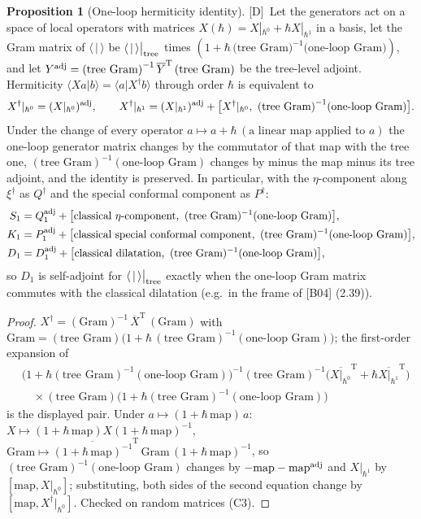 \documentclass[11pt]{article}
\theoremstyle{definition}
\newtheorem{proposition}{Proposition}
\newcommand{\Dl}{\textup{[D]}}
\newcommand{\tree}{\big|_{\rm tree}}
\begin{document}
\begin{proposition}[One-loop hermiticity identity]\label{t:herm}
\Dl\ Let the generators act on a space of local operators with matrices $X(\hbar)=X|_{\hbar^0}+\hbar X|_{\hbar^1}$ in a basis, let the Gram matrix of $\langle\,|\,\rangle$ be $\langle\,|\,\rangle\tree$ times $(1+\hbar\,\text{(tree Gram)}^{-1}\text{(one-loop Gram)})$, and let $Y^{\rm adj}=\text{(tree Gram)}^{-1}\,\overline Y^{\mathrm T}\,\text{(tree Gram)}$ be the tree-level adjoint. Hermiticity $\langle Xa|b\rangle=\langle a|X^\dagger b\rangle$ through order $\hbar$ is equivalent to
\[
X^\dagger|_{\hbar^0}=(X|_{\hbar^0})^{\rm adj},\qquad X^\dagger|_{\hbar^1}=(X|_{\hbar^1})^{\rm adj}+\big[X^\dagger|_{\hbar^0},\ \text{(tree Gram)}^{-1}\text{(one-loop Gram)}\big].
\]
Under the change of every operator $a\mapsto a+\hbar\,(\text{a linear map applied to }a)$ the one-loop generator matrix changes by the commutator of that map with the tree one, $(\text{tree Gram})^{-1}(\text{one-loop Gram})$ changes by minus the map minus its tree adjoint, and the identity is preserved. In particular, with the $\eta$-component along $\xi^\dagger$ as $Q^\dagger$ and the special conformal component as $P^\dagger$:
\[
\begin{aligned}
S_1&=Q_1^{\rm adj}+\big[\text{classical }\eta\text{-component},\ (\text{tree Gram})^{-1}(\text{one-loop Gram})\big],\\
K_1&=P_1^{\rm adj}+\big[\text{classical special conformal component},\ (\text{tree Gram})^{-1}(\text{one-loop Gram})\big],\\
D_1&=D_1^{\rm adj}+\big[\text{classical dilatation},\ (\text{tree Gram})^{-1}(\text{one-loop Gram})\big],
\end{aligned}
\]
so $D_1$ is self-adjoint for $\langle\,|\,\rangle\tree$ exactly when the one-loop Gram matrix commutes with the classical dilatation (e.g.\ in the frame of [B04] (2.39)).
\end{proposition}
\begin{proof}
$X^\dagger=(\text{Gram})^{-1}\,\overline X^{\mathrm T}\,(\text{Gram})$ with $\text{Gram}=(\text{tree Gram})\big(1+\hbar\,(\text{tree Gram})^{-1}(\text{one-loop Gram})\big)$; the first-order expansion of
\[
\begin{aligned}
&\big(1+\hbar(\text{tree Gram})^{-1}(\text{one-loop Gram})\big)^{-1}(\text{tree Gram})^{-1}\big(\overline{X|_{\hbar^0}}^{\mathrm T}+\hbar\overline{X|_{\hbar^1}}^{\mathrm T}\big)\\
&\quad\times(\text{tree Gram})\big(1+\hbar(\text{tree Gram})^{-1}(\text{one-loop Gram})\big)
\end{aligned}
\]
is the displayed pair. Under $a\mapsto(1+\hbar\,\text{map})\,a$: $X\mapsto(1+\hbar\,\text{map})X(1+\hbar\,\text{map})^{-1}$, $\text{Gram}\mapsto\overline{(1+\hbar\,\text{map})^{-1}}^{\mathrm T}\,\text{Gram}\,(1+\hbar\,\text{map})^{-1}$, so $(\text{tree Gram})^{-1}(\text{one-loop Gram})$ changes by $-\text{map}-\text{map}^{\rm adj}$ and $X|_{\hbar^1}$ by $[\text{map},X|_{\hbar^0}]$; substituting, both sides of the second equation change by $[\text{map},X^\dagger|_{\hbar^0}]$. Checked on random matrices (C3).
\end{proof}
\end{document}
